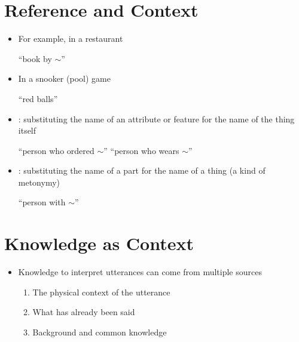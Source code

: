 \documentclass[headrule,footrule]{foils}
\begin{document}
\section{Reference and Context}
\MyLogo{}


\begin{itemize}\addtolength{\itemsep}{-1.5ex}
\item For example, in a restaurant
  \begin{exe}
    \ex {} \textnormal{``book by $\sim$''}
  \end{exe}
\item In a snooker (pool)  game
  \begin{exe}
    \ex {} ``red balls''
  \end{exe}
\item {}: substituting the name of an attribute or feature for the name of the thing itself
  \begin{exe}
    \ex {} ``person who ordered $\sim$''
    \ex {} ``person who wears $\sim$''
  \end{exe}
  \item {}: substituting the name of a part for the name of a thing 
    (a kind of metonymy)
  \begin{exe}
    \ex {} ``person with $\sim$''
  \end{exe}
\end{itemize}

\section{Knowledge as Context}

\begin{itemize}
\item Knowledge to interpret utterances can come from multiple sources
  \begin{enumerate}
  \item The physical context of the utterance
    \\ 
  \item What has already been said
    \\ 
  \item Background and common knowledge
    \\ 
  \end{enumerate}
\end{itemize}
\end{document}
